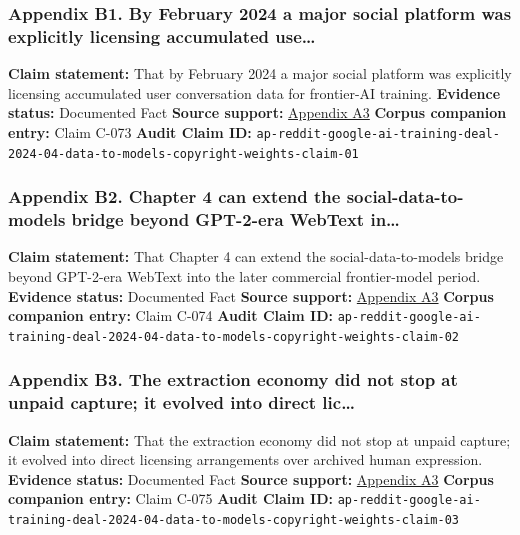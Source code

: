 \documentclass[
  american,
  11pt,
  letterpaper,
]{article}
\begin{document}
\subsubsection{Appendix B1. By February 2024 a major social platform was
explicitly licensing accumulated
use\ldots{}}\label{appendix-b1-by-february-2024-a-major-social-platform-was-explicitly-licensing-accumulated-use}

\textbf{Claim statement:} That by February 2024 a major social platform
was explicitly licensing accumulated user conversation data for
frontier-AI training. \textbf{Evidence status:} Documented Fact
\textbf{Source support:}
\hyperref[appendix-a3-reddit-strikes-60m-deal-allowing-google-to-train-ai-models-on-its-posts-unveils-ipo-plans]{Appendix
A3} \textbf{Corpus companion entry:} Claim C-073 \textbf{Audit Claim
ID:}
\texttt{ap-reddit-google-ai-training-deal-2024-04-data-to-models-copyright-weights-claim-01}

\subsubsection{Appendix B2. Chapter 4 can extend the
social-data-to-models bridge beyond GPT-2-era WebText
in\ldots{}}\label{appendix-b2-chapter-4-can-extend-the-social-data-to-models-bridge-beyond-gpt-2-era-webtext-in}

\textbf{Claim statement:} That Chapter 4 can extend the
social-data-to-models bridge beyond GPT-2-era WebText into the later
commercial frontier-model period. \textbf{Evidence status:} Documented
Fact \textbf{Source support:}
\hyperref[appendix-a3-reddit-strikes-60m-deal-allowing-google-to-train-ai-models-on-its-posts-unveils-ipo-plans]{Appendix
A3} \textbf{Corpus companion entry:} Claim C-074 \textbf{Audit Claim
ID:}
\texttt{ap-reddit-google-ai-training-deal-2024-04-data-to-models-copyright-weights-claim-02}

\subsubsection{Appendix B3. The extraction economy did not stop at
unpaid capture; it evolved into direct
lic\ldots{}}\label{appendix-b3-the-extraction-economy-did-not-stop-at-unpaid-capture-it-evolved-into-direct-lic}

\textbf{Claim statement:} That the extraction economy did not stop at
unpaid capture; it evolved into direct licensing arrangements over
archived human expression. \textbf{Evidence status:} Documented Fact
\textbf{Source support:}
\hyperref[appendix-a3-reddit-strikes-60m-deal-allowing-google-to-train-ai-models-on-its-posts-unveils-ipo-plans]{Appendix
A3} \textbf{Corpus companion entry:} Claim C-075 \textbf{Audit Claim
ID:}
\texttt{ap-reddit-google-ai-training-deal-2024-04-data-to-models-copyright-weights-claim-03}
\end{document}

